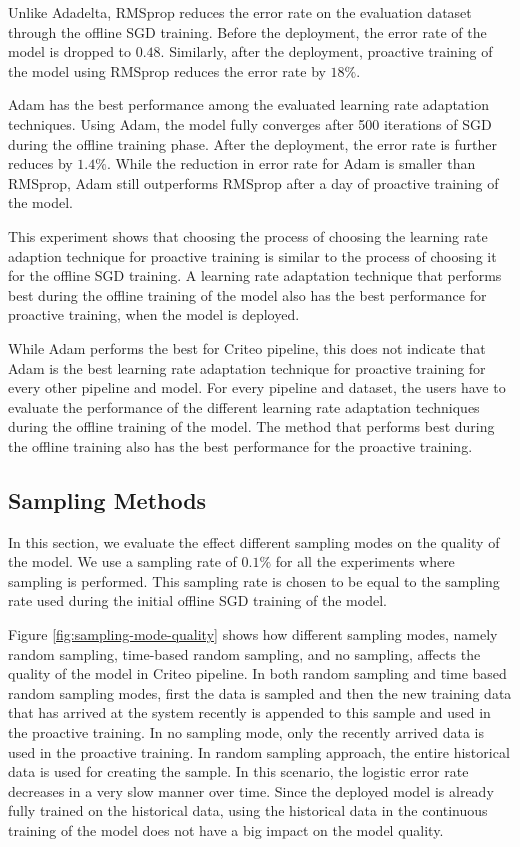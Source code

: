 Unlike Adadelta, RMSprop reduces the error rate on the evaluation dataset through the offline SGD training.
Before the deployment, the error rate of the model is dropped to $0.48$.
Similarly, after the deployment, proactive training of the model using RMSprop reduces the error rate by $18\%$.

Adam has the best performance among the evaluated learning rate adaptation techniques.
Using Adam, the model fully converges after 500 iterations of SGD during the offline training phase.
After the deployment, the error rate is further reduces by $1.4\%$.
While the reduction in error rate for Adam is smaller than RMSprop, Adam still outperforms RMSprop after a day of proactive training of the model.

This experiment shows that choosing the process of choosing the learning rate adaption technique for proactive training is similar to the process of choosing it for the offline SGD training.
A learning rate adaptation technique that performs best during the offline training of the model also has the best performance for proactive training, when the model is deployed.

While Adam performs the best for Criteo pipeline, this does not indicate that Adam is the best learning rate adaptation technique for proactive training for every other pipeline and model.
For every pipeline and dataset, the users have to evaluate the performance of the different learning rate adaptation techniques during the offline training of the model.
The method that performs best during the offline training also has the best performance for the proactive training.

\subsection{Sampling Methods}
In this section, we evaluate the effect different sampling modes on the quality of the model.
We use a sampling rate of $0.1\%$ for all the experiments where sampling is performed.
This sampling rate is chosen to be equal to the sampling rate used during the initial offline SGD training of the model.

Figure \ref{fig:sampling-mode-quality} shows how different sampling modes, namely random sampling, time-based random sampling, and no sampling, affects the quality of the model in Criteo pipeline.
In both random sampling and time based random sampling modes, first the data is sampled and then the new training data that has arrived at the system recently is appended to this sample and used in the proactive training.
In no sampling mode, only the recently arrived data is used in the proactive training.
In random sampling approach, the entire historical data is used for creating the sample.
In this scenario, the logistic error rate decreases in a very slow manner over time.
Since the deployed model is already fully trained on the historical data, using the historical data in the continuous training of the model does not have a big impact on the model quality.

